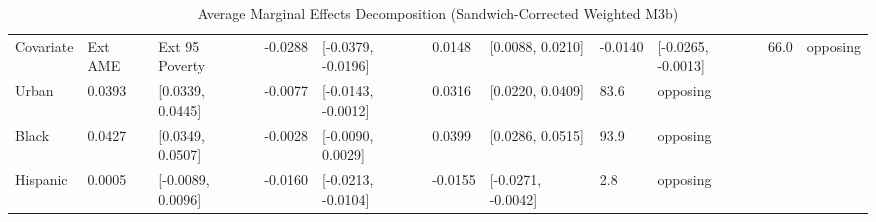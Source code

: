 \begin{table}[htbp]
\centering
\begin{tabular}{lllllllll}
  \toprule
Covariate & Ext AME & Ext 95%
  \midrule
Poverty & -0.0288 & [-0.0379, -0.0196] & 0.0148 & [0.0088, 0.0210] & -0.0140 & [-0.0265, -0.0013] & 66.0 & opposing \\ 
  Urban & 0.0393 & [0.0339, 0.0445] & -0.0077 & [-0.0143, -0.0012] & 0.0316 & [0.0220, 0.0409] & 83.6 & opposing \\ 
  Black & 0.0427 & [0.0349, 0.0507] & -0.0028 & [-0.0090, 0.0029] & 0.0399 & [0.0286, 0.0515] & 93.9 & opposing \\ 
  Hispanic & 0.0005 & [-0.0089, 0.0096] & -0.0160 & [-0.0213, -0.0104] & -0.0155 & [-0.0271, -0.0042] & 2.8 & opposing \\ 
   \bottomrule
\end{tabular}
\caption{Average Marginal Effects Decomposition (Sandwich-Corrected Weighted M3b)} 
\end{table}
